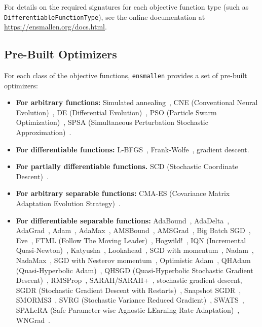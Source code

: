 For details on the required signatures for each objective function type
(such as {\tt DifferentiableFunctionType}),
see the online documentation at \mbox{\url{https://ensmallen.org/docs.html}}.


\subsection{Pre-Built Optimizers}

For each class of the objective functions,
{\tt ensmallen} provides a set of pre-built optimizers:

\begin{itemize}
  \item {\bf For arbitrary functions:}  Simulated
annealing~\cite{kirkpatrick1983optimization}, CNE
(Conventional Neural Evolution)~\cite{montana1989training}, DE (Differential
Evolution)~\cite{storn1997differential}, PSO (Particle Swarm
Optimization)~\cite{Kennedy1995}, SPSA (Simultaneous Perturbation
Stochastic Approximation)~\cite{spall1992multivariate}.

  \item {\bf For differentiable functions:}  L-BFGS~\cite{liu1989limited},
Frank-Wolfe~\cite{jaggi2013revisiting}, gradient descent.

  \item {\bf For partially differentiable functions.}  SCD (Stochastic
Coordinate Descent)~\cite{Shalev-Shwartz2009}.

  \item {\bf For arbitrary separable functions:}  CMA-ES (Covariance Matrix
Adaptation Evolution Strategy)~\cite{Hansen2001}.

  \item {\bf For differentiable separable functions:}
AdaBound~\cite{Luo2019AdaBound},
AdaDelta~\cite{zeiler2012adadelta}, AdaGrad~\cite{duchi2011adaptive},
Adam~\cite{Kingma2014}, AdaMax~\cite{Kingma2014},
AMSBound~\cite{Luo2019AdaBound}, AMSGrad~\cite{reddi2019convergence},
Big Batch SGD~\cite{De2017}, Eve~\cite{Koushik2016}, FTML (Follow The Moving
Leader)~\cite{Zheng2017},
Hogwild!~\cite{recht2011hogwild}, IQN
(Incremental Quasi-Newton)~\cite{1106.5730}, Katyusha~\cite{Allen-Zhu2016},
Lookahead~\cite{Zhang2019}, SGD with momentum~\cite{rumelhart1988learning},
Nadam~\cite{Dozat2015},
NadaMax~\cite{Dozat2015}, SGD with Nesterov momentum~\cite{Nesterov1983},
Optimistic
Adam~\cite{daskalakis2017training}, QHAdam (Quasi-Hyperbolic
Adam)~\cite{ma2019qh}, QHSGD
(Quasi-Hyperbolic Stochastic Gradient Descent)~\cite{ma2019qh},
RMSProp~\cite{tieleman2012lecture},
SARAH/SARAH+~\cite{Nguyen2017}, stochastic gradient descent, SGDR (Stochastic Gradient
Descent with Restarts)~\cite{Loshchilov2016}, Snapshot SGDR~\cite{Huang2017},
SMORMS3~\cite{Funk2015}, SVRG (Stochastic Variance Reduced
Gradient)~\cite{Johnson2013}, SWATS~\cite{Keskar2017},
SPALeRA (Safe Parameter-wise Agnostic LEarning Rate
Adaptation)~\cite{Schoenauer2017},
WNGrad~\cite{Wu2018}.


\end{itemize}
